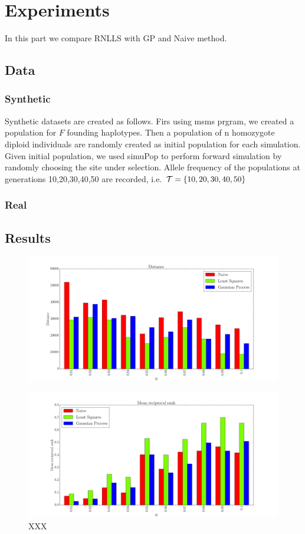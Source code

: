 \section{Experiments}
In this part we compare RNLLS with GP and Naive method. 
\subsection{Data}
\subsubsection{Synthetic}
Synthetic datasets are created as follows. Firs using msms prgram, we created a population for $F$ founding haplotypes. Then a population of n homozygote diploid individuals are randomly created as initial population for each simulation. Given initial population, we used simuPop to perform forward simulation by randomly choosing the site under selection. Allele frequency of the populations at generations 10,20,30,40,50 are recorded, i.e. ${\cal T}=\{10,20,30,40,50\}$
\subsubsection{Real}

\subsection{Results}
\begin{figure}[t]
  \centering
    \includegraphics[width=\textwidth]{dist}
  \caption{}
  \label{fig:Fig1}
\end{figure}

\begin{figure}[h]
  \centering
    \includegraphics[width=\textwidth]{mrr}
  \caption{XXX}
  \label{fig:Fig2}
\end{figure}

